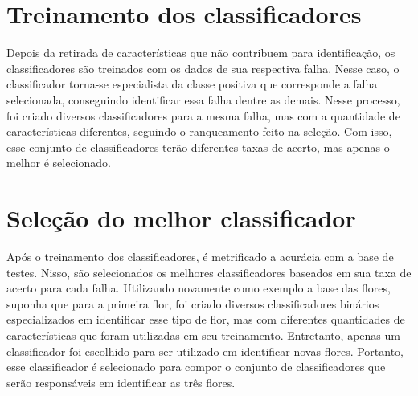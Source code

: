 \section{Treinamento dos classificadores}

Depois da retirada de características que não contribuem para identificação, os classificadores são treinados com os dados de sua respectiva falha. Nesse caso, o classificador torna-se especialista da classe positiva que corresponde a falha selecionada, conseguindo identificar essa falha dentre as demais. Nesse processo, foi criado diversos classificadores para a mesma falha, mas com a quantidade de características diferentes, seguindo o ranqueamento feito na seleção. Com isso, esse conjunto de classificadores terão diferentes taxas de acerto, mas apenas o melhor é selecionado.

\section{Seleção do melhor classificador}

Após o treinamento dos classificadores, é metrificado a acurácia com a base de testes. Nisso, são selecionados os melhores classificadores baseados em sua taxa de acerto para cada falha. Utilizando novamente como exemplo a base das flores, suponha que para a primeira flor, foi criado diversos classificadores binários especializados em identificar esse tipo de flor, mas com diferentes quantidades de características que foram utilizadas em seu treinamento. Entretanto, apenas um classificador foi escolhido para ser utilizado em identificar novas flores. Portanto, esse classificador é selecionado para compor o conjunto de classificadores que serão responsáveis em identificar as três flores.